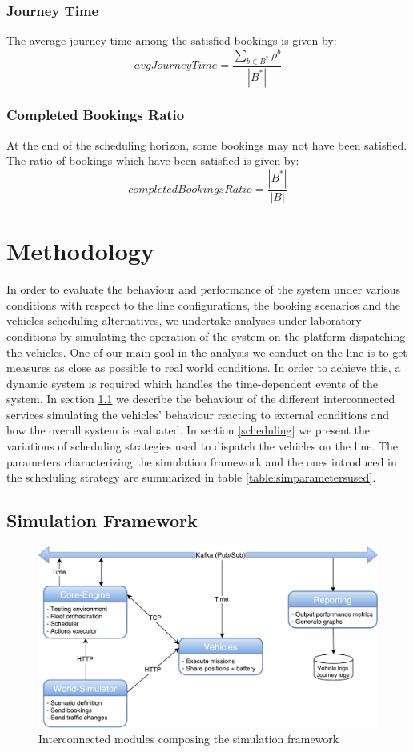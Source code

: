 \documentclass[12pt,a4paper]{article}
\begin{document}
\subsubsection*{Journey Time}
The average journey time among the satisfied bookings is given by:
$$avgJourneyTime = \frac{\sum_{b \in B^{*}}\rho^{b}}{|B^{*}|} $$

\subsubsection*{Completed Bookings Ratio}
At the end of the scheduling horizon, some bookings may not have been satisfied. The ratio of bookings which have been satisfied is given by:
$$completedBookingsRatio = \frac{|B^{*}|}{|B|}$$

\section{Methodology}
In order to evaluate the behaviour and performance of the system under various conditions with respect to the line configurations, the booking scenarios and the vehicles scheduling alternatives, we undertake analyses under laboratory conditions by simulating the operation of the system on the platform dispatching the vehicles. One of our main goal in the analysis we conduct on the line is to get measures as close as possible to real world conditions. In order to achieve this, a dynamic system is required which handles the time-dependent events of the system. In section \ref{framework} we describe the behaviour of the different interconnected services simulating the vehicles' behaviour reacting to external conditions and how the overall system is evaluated. In section \ref{scheduling} we present the variations of scheduling strategies used to dispatch the vehicles on the line. The parameters characterizing the simulation framework and the ones introduced in the scheduling strategy are summarized in table \ref{table:simparametersused}. 

\subsection{Simulation Framework}\label{framework}
\setlength{\belowcaptionskip}{10pt}
\begin{figure}[h] 
  \centering
\includegraphics[scale=0.55]{./images/SimulationFramework2.pdf}
\caption{Interconnected modules composing the simulation framework}
\label{fig:simulationFramework}
\end{figure}
\end{document}
